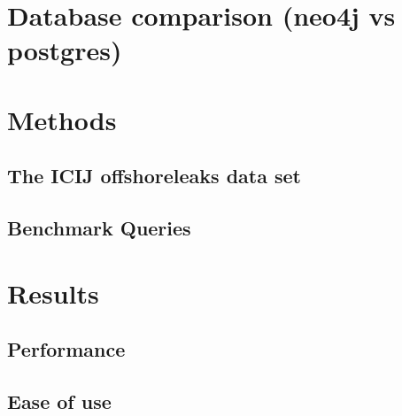 \documentclass[11pt, a4paper,oneside,chapterprefix=false]{scrbook}
\begin{document}
\chapter{Database comparison (neo4j vs postgres)} \label{chp:theory}



\chapter{Methods} \label{chp:methods}


\section{The ICIJ offshoreleaks data set} \label{sec:dataset}


\section{Benchmark Queries} \label{sec:benchmark}

\chapter{Results} \label{chp:results}


\section{Performance} \label{sec:performance}

\section{Ease of use} \label{sec:convenience}
\end{document}
